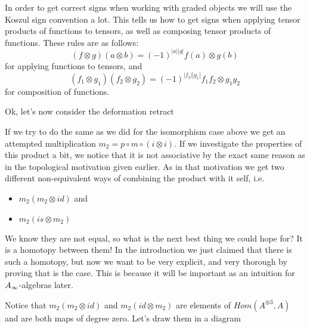 In order to get correct signs when working with graded objects we will use the Koszul sign convention a lot. This tells us how to get signs when applying tensor products of functions to tensors, as well as composing tensor products of functions. These rules are as follows: 
\begin{equation*}
    (f\otimes g)(a\otimes b) = (-1)^{|a||g|}f(a)\otimes g(b)
\end{equation*} 
for applying functions to tensors, and
\begin{equation*}
    (f_1\otimes g_1)(f_2\otimes g_2) = (-1)^{|f_2||g_1|}f_1 f_2 \otimes g_1 g_2
\end{equation*}
for composition of functions. 

Ok, let's now consider the deformation retract
\begin{center}
\end{center}

If we try to do the same as we did for the isomorphism case above we get an attempted multiplication $m_2 = p\circ m \circ (i\otimes i)$. If we investigate the properties of this product a bit, we notice that it is not associative by the exact same reason as in the topological motivation given earlier. As in that motivation we get two different non-equivalent ways of combining the product with it self, i.e. 
\begin{itemize}
    \item $m_2(m_2\otimes id)$ and 
    \item $m_2(is\otimes m_2)$
\end{itemize}
We know they are not equal, so what is the next best thing we could hope for? It is a homotopy between them! In the introduction we just claimed that there is such a homotopy, but now we want to be very explicit, and very thorough by proving that is the case. This is because it will be important as an intuition for $A_{\infty}$-algebras later. 

Notice that $m_2(m_2\otimes id)$ and $m_2(id\otimes m_2)$ are elements of $Hom(A^{\otimes 3}, A)$ and are both maps of degree zero. Let's draw them in a diagram
\begin{center}
\end{center}

